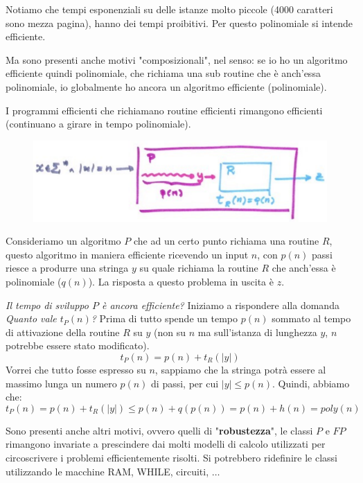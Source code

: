 \documentclass{article}
\begin{document}
Notiamo che tempi esponenziali su delle istanze molto piccole (4000 caratteri sono mezza
pagina), hanno dei tempi proibitivi. Per questo polinomiale si intende efficiente.

Ma sono presenti anche motivi "composizionali", nel senso: se io ho un algoritmo efficiente
quindi polinomiale, che richiama una sub routine che è anch'essa polinomiale, io
globalmente ho ancora un algoritmo efficiente (polinomiale).

I programmi efficienti che richiamano routine efficienti rimangono efficienti (continuano
a girare in tempo polinomiale).
\begin{figure}[H]
    \centering
    \includegraphics[scale=0.5]{images/efficienti_esemp.png}
\end{figure}
Consideriamo un algoritmo $P$ che ad un certo punto richiama una routine $R$, questo algoritmo
in maniera efficiente ricevendo un input $n$, con $p(n)$ passi riesce a produrre una
stringa $y$ su quale richiama la routine $R$ che anch'essa è polinomiale ($q(n)$). La risposta a questo
problema in uscita è $z$.

\textit{Il tempo di sviluppo $P$ è ancora efficiente?} Iniziamo a rispondere alla domanda
\textit{Quanto vale $t_P(n)$?} Prima di tutto spende un tempo $p(n)$  sommato al tempo
di attivazione della routine $R$ su $y$ (non su $n$ ma sull'istanza di lunghezza $y$, $n$
potrebbe essere stato modificato).
$$t_P(n)=p(n)+t_R(|y|)$$
Vorrei che tutto fosse espresso su $n$, sappiamo che la stringa potrà essere al massimo lunga
un numero $p(n)$ di passi, per cui $|y|\leq p(n)$. Quindi, abbiamo che:
$$t_P(n)=p(n)+t_R(|y|)\leq p(n)+q(p(n))=p(n)+h(n)=poly(n)$$

Sono presenti anche altri motivi, ovvero quelli di "\textbf{robustezza}", le classi $P$ e $FP$ rimangono
invariate a prescindere dai molti modelli di calcolo utilizzati per circoscrivere i problemi
efficientemente risolti. Si potrebbero ridefinire le classi utilizzando le macchine RAM, WHILE,
circuiti, $\dots$
\end{document}
